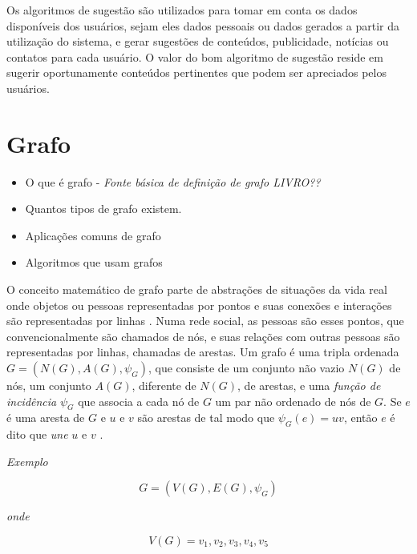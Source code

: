 Os algoritmos de sugestão são utilizados para tomar em conta os dados disponíveis dos usuários, sejam eles dados pessoais ou dados gerados a partir da utilização do sistema, e gerar sugestões de conteúdos, publicidade, notícias ou contatos para cada usuário. O valor do bom algoritmo de sugestão reside em sugerir oportunamente conteúdos pertinentes que podem ser apreciados pelos usuários.





\section{Grafo}

\begin{itemize}
\item O que é grafo - \emph{Fonte básica de definição de grafo LIVRO??}
\item Quantos tipos de grafo existem.
\item Aplicações comuns de grafo
\item Algoritmos que usam grafos
\end{itemize}

O conceito matemático de grafo parte de abstrações de situações da vida real onde objetos ou pessoas representadas por pontos e suas conexões e interações são representadas por linhas \cite{Bondy08}. Numa rede social, as pessoas são esses pontos, que convencionalmente são chamados de nós, e suas relações com outras pessoas são representadas por linhas, chamadas de arestas. Um grafo é uma tripla ordenada $G=(N(G), A(G), \psi _{G})$, que consiste de um conjunto não vazio $N(G)$ de nós, um conjunto $A(G)$, diferente de $N(G)$, de arestas, e uma \emph{função de incidência} $\psi_{G}$ que associa a cada nó de $G$ um par não ordenado de nós de $G$. Se $e$ é uma aresta de $G$ e $u$ e $v$ são arestas de tal modo que $\psi_{G}(e) = uv$, então $e$ é dito que \emph{une} $u$ e $v$ \cite{Bondy08}.

\emph{Exemplo}

\begin{equation}
G=(V(G), E(G), \psi _{G})
\label{eq:grafo}
\end{equation}

\emph{onde}

\begin{equation}
V(G)={v_{1}, v_{2}, v_{3}, v_{4}, v_{5}}
\label{eq:grafo2}
\end{equation}

